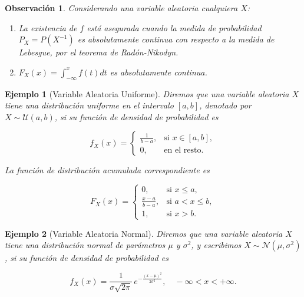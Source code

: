 \documentclass{report}
\newtheorem{dfn}{Definición}[section]
\newtheorem{obs}{Observación}[section]
\newtheorem{ej}{Ejemplo}[section]
\begin{document}
%
%



\begin{obs}
    Considerando una variable aleatoria cualquiera $X$:
    \begin{enumerate}
        \item La existencia de $f$ está asegurada cuando la medida de probabilidad $P_X=P(X^{-1})$ es absolutamente continua con respecto a la medida de Lebesgue,
        por el teorema de Radón-Nikodyn.
        \item $F_X(x) = \int_{-\infty}^x f(t)dt$ es absolutamente continua.
    \end{enumerate}
\end{obs}

\begin{ej}[Variable Aleatoria Uniforme]
Diremos que una variable aleatoria \( X \) tiene una \emph{distribución uniforme en el intervalo} \([a,b]\), denotado por \( X \sim \mathcal{U}(a,b) \),
si su función de densidad de probabilidad es

\[
f_X(x) = \begin{cases}
\frac{1}{b - a}, & \text{si } x \in [a,b], \\
0, & \text{en el resto.}
\end{cases}
\]

La función de distribución acumulada correspondiente es

\[
F_X(x) = \begin{cases}
0, & \text{si } x \le a, \\
\frac{x - a}{b - a}, & \text{si } a < x \le b, \\
1, & \text{si } x > b.
\end{cases}
\]
\end{ej}

\begin{ej}[Variable Aleatoria Normal]\label{def distribucion normal}
Diremos que una variable aleatoria \( X \) tiene una \textit{distribución normal de parámetros} \( \mu \) y \( \sigma^2 \), y escribimos
\( X \sim \mathcal{N}(\mu, \sigma^2) \), si su función de densidad de probabilidad es

\[
f_X(x) = \frac{1}{\sigma \sqrt{2\pi}} \, e^{ -\frac{(x - \mu)^2}{2\sigma^2} }, \quad -\infty < x < +\infty.
\]
\end{ej}
\end{document}
